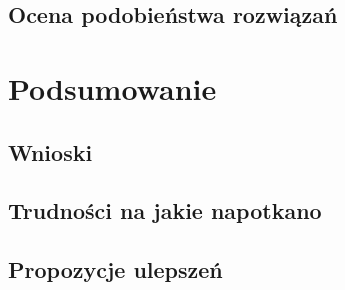 \documentclass{article}
\begin{document}
	\subsection{Ocena podobieństwa rozwiązań}
\section{Podsumowanie}
	\subsection{Wnioski}
	\subsection{Trudności na jakie napotkano}
	\subsection{Propozycje ulepszeń}




\end{document}
